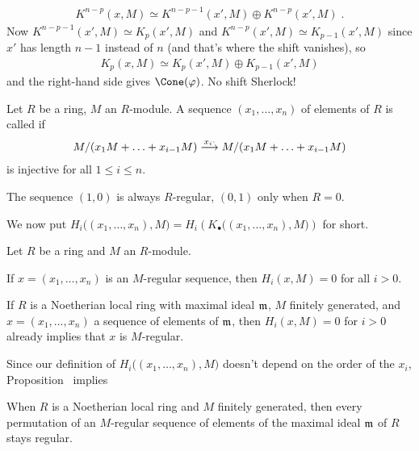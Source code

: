 \documentclass[a4paper,parskip=half,numbers=enddot, DIV=12]{scrreprt}
\begin{document}
\begin{align*}
	K^{n-p}(x,M)\simeq K^{n-p-1}(x',M)\oplus K^{n-p}(x',M)\;.
\end{align*}
Now $K^{n-p-1}(x',M)\simeq K_p(x',M)$ and $K^{n-p}(x',M)\simeq K_{p-1}(x',M)$ since $x'$ has length $n-1$ instead of $n$ (and that's where the shift vanishes), so
\begin{align*}
	K_p(x,M)\simeq K_p(x',M)\oplus K_{p-1}(x',M)
\end{align*}
and the right-hand side gives $\Cone(\phi)$. No shift Sherlock!
\begin{defi}
	Let $R$ be a ring, $M$ an $R$-module. A sequence $(x_1,\ldots,x_n)$ of elements of $R$ is called  if
	\begin{align*}
		M/(x_1M+\ldots+x_{i-1}M)\morphism[x_i\cdot ]M/(x_1M+\ldots+x_{i-1}M)
	\end{align*}
	is injective for all $1\leq i\leq n$.
\end{defi}
\begin{example}
	The sequence $(1,0)$ is always $R$-regular, $(0,1)$ only when $R=0$.
\end{example}
We now put $H_i\big((x_1,\ldots,x_n),M\big)=H_i\left(K_\bullet\big((x_1,\ldots,x_n),M\big)\right)$ for short.
\begin{prop}
	Let $R$ be a ring and $M$ an $R$-module.
	\begin{alphanumerate}
		\item If $x=(x_1,\ldots,x_n)$ is an $M$-regular sequence, then $H_i(x,M)=0$ for all $i>0$.
		\item If $R$ is a Noetherian local ring with maximal ideal $\mathfrak{m}$, $M$ finitely generated, and $x=(x_1,\ldots,x_n)$ a sequence of elements of $\mathfrak{m}$, then $H_i(x,M)=0$ for $i>0$ already implies that $x$ is $M$-regular.
	\end{alphanumerate}
\end{prop}
Since our definition of $H_i\big((x_1,\ldots,x_n),M\big)$ doesn't depend on the order of the $x_i$, Proposition~ implies
\begin{cor}
	When $R$ is a Noetherian local ring and $M$ finitely generated, then every permutation of an $M$-regular sequence of elements of the maximal ideal $\mathfrak{m}$ of $R$ stays regular.
\end{cor}
\end{document}
